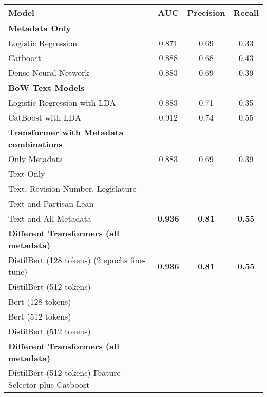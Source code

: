\documentclass[11pt]{article}
\begin{document}
\begin{tabular}{ l  c  c  c}
 Model & AUC & Precision & Recall  \\
 \hline
 \textbf{Metadata Only} & & & \\
\hspace{3mm}Logistic Regression & 0.871 & 0.69 & 0.33 \\
\hspace{3mm}Catboost  & 0.888 & 0.68 & 0.43 \\
\hspace{3mm} Dense Neural Network & 0.883 &  0.69 & 0.39 \\
\hline
\textbf{BoW Text Models} & & & \\
\hspace{3mm}Logistic Regression with LDA & 0.883 & 0.71 & 0.35 \\
\hspace{3mm}CatBoost with LDA & 0.912 & 0.74 & 0.55 \\ 
\hline
\textbf{Transformer with Metadata combinations} & & & \\
\hspace{3mm}Only Metadata & 0.883 & 0.69 & 0.39 \\
\hspace{3mm}Text Only & & & \\
\hspace{3mm}Text, Revision Number, Legislature & & & \\
\hspace{3mm}Text and Partisan Lean & & & \\
\hspace{3mm}Text and All Metadata & \textbf{ 0.936 }& \textbf{0.81} & \textbf{0.55} \\
\hline
\textbf{Different Transformers (all metadata)} & & & \\
\hspace{3mm}DistilBert (128 tokens) (2 epochs fine-tune) & \textbf{ 0.936 }& \textbf{0.81} & \textbf{0.55} \\
\hspace{3mm}DistilBert (512 tokens)  &  & & \\
\hspace{3mm}Bert (128 tokens) &  & & \\
\hspace{3mm}Bert (512 tokens)  &  & & \\
\hspace{3mm}DistilBert (512 tokens) &  & & \\
\textbf{Different Transformers (all metadata)} & & & \\
\hspace{3mm}DistilBert (512 tokens) Feature Selector plus Catboost&  & & \\

\end{tabular}
\end{document}
